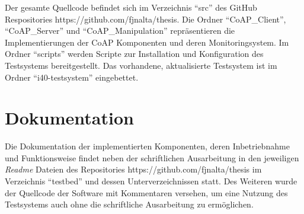 Der gesamte Quellcode befindet sich im Verzeichnis "`src"' des GitHub Respositories https://github.com/fjnalta/thesis. Die Ordner "`CoAP\_Client"', "`CoAP\_Server"' und "`CoAP\_Manipulation"' repräsentieren die Implementierungen der \ac{CoAP} Komponenten und deren Monitoringsystem. Im Ordner "`scripts"' werden Scripte zur Installation und Konfiguration des Testsystems bereitgestellt. Das vorhandene, aktualisierte Testsystem ist im Ordner "`i40-testsystem"' eingebettet.

\section{Dokumentation}
Die Dokumentation der implementierten Komponenten, deren Inbetriebnahme und Funktionsweise findet neben der schriftlichen Ausarbeitung in den jeweiligen \textit{Readme} Dateien des Repositories https://github.com/fjnalta/thesis im Verzeichnis "`testbed"' und dessen Unterverzeichnissen statt. Des Weiteren wurde der Quellcode der Software mit Kommentaren versehen, um eine Nutzung des Testsystems auch ohne die schriftliche Ausarbeitung zu ermöglichen.